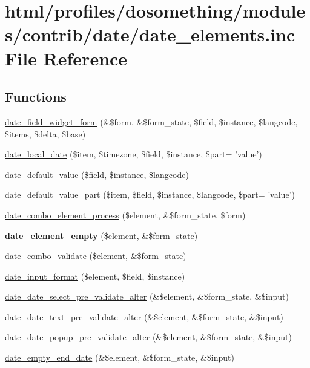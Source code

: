 \hypertarget{date__elements_8inc}{
\section{html/profiles/dosomething/modules/contrib/date/date\_\-elements.inc File Reference}
\label{date__elements_8inc}
}
\subsection*{Functions}
\begin{DoxyCompactItemize}
\item 
\hyperlink{date__elements_8inc_abed5ce13fbc96267910eba507d2c6989}{date\_\-field\_\-widget\_\-form} (\&\$form, \&\$form\_\-state, \$field, \$instance, \$langcode, \$items, \$delta, \$base)
\item 
\hyperlink{date__elements_8inc_aafe3fa0de290a2166dc60e7a44a7cb53}{date\_\-local\_\-date} (\$item, \$timezone, \$field, \$instance, \$part= 'value')
\item 
\hyperlink{date__elements_8inc_aa01d96bc4c74fb8c7f8c2fc36d05d199}{date\_\-default\_\-value} (\$field, \$instance, \$langcode)
\item 
\hyperlink{date__elements_8inc_aa64b1801dba4cfa8c0ca02099fa7147a}{date\_\-default\_\-value\_\-part} (\$item, \$field, \$instance, \$langcode, \$part= 'value')
\item 
\hyperlink{date__elements_8inc_a9542273df9fca1ba0a55c26573f3744e}{date\_\-combo\_\-element\_\-process} (\$element, \&\$form\_\-state, \$form)
\item 
\hypertarget{date__elements_8inc_ae114e998da4c9d07524054337a7eed15}{
{\bfseries date\_\-element\_\-empty} (\$element, \&\$form\_\-state)}
\label{date__elements_8inc_ae114e998da4c9d07524054337a7eed15}

\item 
\hyperlink{date__elements_8inc_ad3819d1cdfb02b44cf0d4dd424a837ba}{date\_\-combo\_\-validate} (\$element, \&\$form\_\-state)
\item 
\hyperlink{date__elements_8inc_a3767feebcc2853dda728fffca027b312}{date\_\-input\_\-format} (\$element, \$field, \$instance)
\item 
\hyperlink{date__elements_8inc_a526cbfd5a13f0cf7c0f4fcc36fb174cc}{date\_\-date\_\-select\_\-pre\_\-validate\_\-alter} (\&\$element, \&\$form\_\-state, \&\$input)
\item 
\hyperlink{date__elements_8inc_ab74eeed6b68ddd639f767a6973725f6b}{date\_\-date\_\-text\_\-pre\_\-validate\_\-alter} (\&\$element, \&\$form\_\-state, \&\$input)
\item 
\hyperlink{date__elements_8inc_a955d565e21db7029f550ce0f35bda5d2}{date\_\-date\_\-popup\_\-pre\_\-validate\_\-alter} (\&\$element, \&\$form\_\-state, \&\$input)
\item 
\hyperlink{date__elements_8inc_a9de4ee190a27560be3dddbb7f951cf24}{date\_\-empty\_\-end\_\-date} (\&\$element, \&\$form\_\-state, \&\$input)
\end{DoxyCompactItemize}


